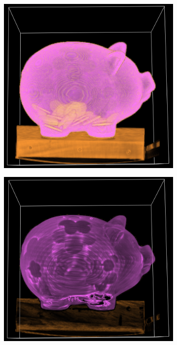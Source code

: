 \begin{figure}[h!]
    \centering
    \captionsetup{justification=centering,margin=0.5cm}
    \begin{subfigure}[t]{0.32\textwidth}
        \includegraphics[width=\textwidth]{img/pig-compositing.png}
        \caption{ }
    \end{subfigure}
    \begin{subfigure}[t]{0.32\textwidth}
        \includegraphics[width=\textwidth]{img/pig-mip.png}

\end{subfigure}
\end{figure}
